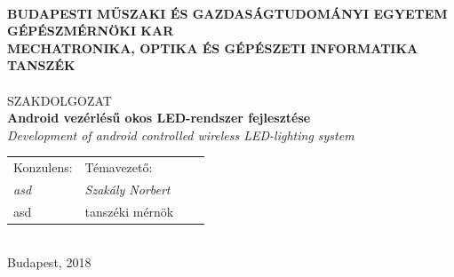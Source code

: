 \documentclass[12pt,a4paper]{article}
\begin{document}
\thispagestyle{empty}
\begin{titlepage} %
\centering
{}\\[1ex]
{\bf BUDAPESTI MŰSZAKI ÉS GAZDASÁGTUDOMÁNYI EGYETEM}\\
{\bf GÉPÉSZMÉRNÖKI KAR}\\
{\bf MECHATRONIKA, OPTIKA ÉS GÉPÉSZETI INFORMATIKA TANSZÉK}\\[3cm]

{\LARGE \scshape \myname}\\[2ex]
{\LARGE SZAKDOLGOZAT}\\[2ex]
{\LARGE \bf Android vezérlésű okos LED-rendszer fejlesztése}\\[2ex]
{\itshape Development of android controlled wireless LED-lighting system}\\[5cm]

\begin{tabularx}{\textwidth}{XXXX}
Konzulens: & Témavezető: \\
\hspace{0.75cm} \itshape asd & \hspace{0.75cm} \itshape Szakály Norbert \\
\hspace{0.75cm} asd & \hspace{0.75cm} tanszéki mérnök \\
\end{tabularx}\\[5.5cm]

{\Large Budapest, 2018}
\end{titlepage}
\newpage


\setcounter{page}{6}
\newpage

\thispagestyle{plain}
\tableofcontents
\newpage

\thispagestyle{plain}

\newpage
\end{document}
